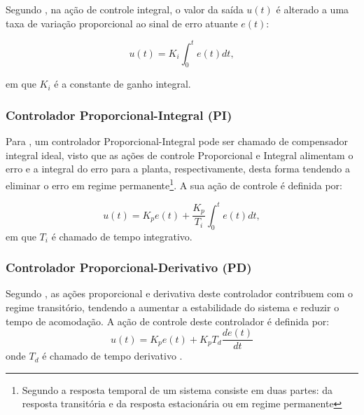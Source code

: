Segundo , na ação de controle integral, o valor da saída $u(t)$ é alterado a uma taxa de variação proporcional 
ao sinal de erro atuante $e(t)$:

\begin{equation}
 u(t) = K_i \int_{0}^{t}e(t)dt,
\end{equation}

em que $K_i$ é a constante de ganho integral. 

\subsubsection{Controlador Proporcional-Integral (PI)}

Para , um controlador Proporcional-Integral pode ser chamado de compensador integral ideal, visto que 
as ações de controle Proporcional e Integral alimentam o erro e a integral do erro para a planta, respectivamente, desta forma 
tendendo a eliminar o erro em regime permanente\footnote{Segundo  a resposta temporal de um sistema consiste em duas 
partes: da resposta transitória e da resposta estacionária ou em regime permanente}. 
A sua ação de controle é definida por: 

\begin{equation}
 u(t) = K_pe(t) + \frac{K_p}{T_i}\int_{0}^{t}e(t)dt,
\end{equation}
em que $T_i$ é chamado de tempo integrativo. 


\subsubsection{Controlador Proporcional-Derivativo (PD)}


Segundo , as ações proporcional e derivativa deste controlador 
contribuem com o regime transitório, %
tendendo a aumentar a estabilidade do sistema e reduzir o tempo de acomodação. 
A ação de controle deste controlador é definida por:
\begin{equation}
 u(t) = K_pe(t) + K_pT_d\frac{de(t)}{dt}
\end{equation}
onde $T_d$ é chamado de tempo derivativo \cite{ogata}.


